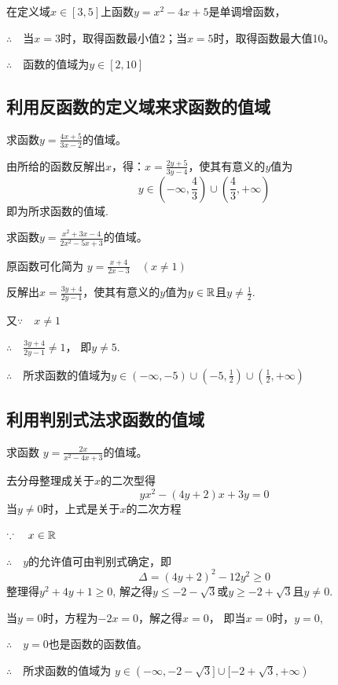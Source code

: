 \begin{solution}
    在定义域$x\in[3,5]$上函数$y=x^2-4x+5$是单调增函数，
    
$\therefore\quad $当$x=3$时，取得函数最小值2；当$x=5$时，取得函数最大值10。

$\therefore\quad $函数的值域为$y\in [2,10]$
\end{solution}


\subsection{利用反函数的定义域来求函数的值域}
\begin{example}
    求函数$y=\frac{4x+5}{3x-2}$的值域。
\end{example}

\begin{solution}
由所给的函数反解出$x$，得：$x=\frac{2y+5}{3y-4}$，使其有意义的$y$值为
\[y\in \left(-\infty,\frac{4}{3}\right)\cup \left(\frac{4}{3},+\infty\right)\]
即为所求函数的值域.

\end{solution}

\begin{example}
    求函数$y=\frac{x^2+3x-4}{2x^2-5x+3}$的值域。
\end{example}

\begin{solution}
原函数可化简为 $y=\frac{x+4}{2x-3}\quad (x\ne 1)$

反解出$x=\frac{3y+4}{2y-1}$，使其有意义的$y$值为$y\in\mathbb{R}$且$y\ne\frac{1}{2}$.

又$\because\quad x\ne 1$

$\therefore\quad \frac{3y+4}{2y-1}\ne 1$， 即$y\ne 5$.

$\therefore\quad $所求函数的值域为$y\in(-\infty,-5)\cup\left(-5,\frac{1}{2}\right)\cup \left(\frac{1}{2},+\infty\right)$
\end{solution}

\subsection{利用判别式法求函数的值域}

\begin{example}
 求函数
$y=\frac{2x}{x^2-4x+3}$的值域。   
\end{example}

\begin{solution}
    去分母整理成关于$x$的二次型得
\[yx^2-(4y+2)x+3y=0\]
当$y\ne 0$时，上式是关于$x$的二次方程

$\because\quad x\in\mathbb{R}$

$\therefore\quad y$的允许值可由判别式确定，即
\[\Delta =(4y+2)^2-12y^2\ge 0\]
整理得$y^2+4y+1\ge 0$, 
解之得$y\le -2-\sqrt{3}$或$y\ge -2+\sqrt{3}$且$y\ne 0$.

当$y=0$时，方程为$-2x=0$，解之得$x=0$，
即当$x=0$时，$y=0$,

$\therefore\quad y=0$也是函数的函数值。

$\therefore\quad $所求函数的值域为
$y\in (-\infty,-2-\sqrt{3}]\cup [-2+\sqrt{3},+\infty)$
\end{solution}

